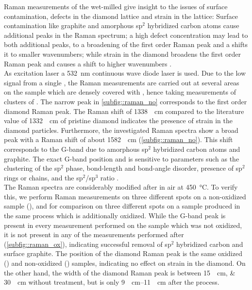 		Raman measurements of the wet-milled \nds give insight to the issues of surface contamination, defects in the diamond lattice and strain in the lattice:
		Surface contamination like graphite and amorphous sp$^2$ hybridized carbon atoms cause additional peaks in the Raman spectrum; a high defect concentration may lead to both additional peaks, to a broadening of the first order Raman peak and a shifts it to smaller wavenumbers; while strain in the diamond broadens the first order Raman peak and causes a shift to higher wavenumbers \cite{Zaitsev2001,Prawer2004,Orwa2000}.
		\\
		As excitation laser a \SI{532}{\nano\meter} continuous wave diode laser is used.
		Due to the low signal from a single \nd, the Raman measurements are carried out at several areas on the sample \insituS which are densely covered with \nds, hence taking measurements of clusters of \nds.
		The narrow peak in \autoref{subfig::raman_no} corresponds to the first order diamond Raman peak.
		The Raman shift of \SI{1338}{\per\centi\meter} compared to the literature value of \SI{1332}{\per\centi\meter} of pristine diamond \cite{Zaitsev2001} indicates the presence of strain in the diamond particles.
		Furthermore, the investigated Raman spectra show a broad peak with a Raman shift of about \SI{1582}{\per\centi\meter} (\autoref{subfig::raman_no}).
		This shift corresponds to the G-band due to amorphous sp$^2$ hybridized carbon atoms and graphite.
		The exact G-band position and \lw is sensitive to parameters such as the clustering of the sp$^2$ phase, bond-length and bond-angle disorder, presence of sp$^2$ rings or chains, and the sp$^2$/sp$^3$ ratio \cite{Ferrari2004}.
		\\
		The \nd Raman spectra are considerably modified after \ox in air at \SI{450}{\degreeCelsius}.
		To verify this, we perform Raman measurements on three different spots on a non-oxidized sample (\insituS), and for comparison on three different spots on a sample produced in the same process which is additionally oxidized.
		While the G-band peak is present in every measurement performed on the sample which was not oxidized, it is not present in any of the measurements performed after \ox (\autoref{subfig::raman_ox}), indicating successful removal of sp$^2$ hybridized carbon and surface graphite.
		The position of the diamond Raman peak is the same oxidized (\insituSo) and non-oxidized (\insituSn) samples, indicating no effect on strain in the diamond.
		On the other hand, the width of the diamond Raman peak is between \SIlist{15; 30}{\per\centi\meter} without \ox treatment, but is only \SIrange{9}{11}{\per\centi\meter} after the \ox process.
